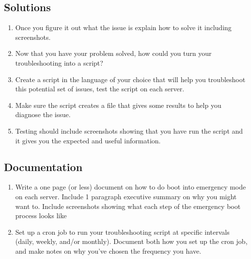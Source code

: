 \documentclass[12pt]{article}
\begin{document}
\subsection*{Solutions}
        \begin{enumerate}
            \item Once you figure it out what the issue is explain how to solve it including screenshots.
            \item Now that you have your problem solved, how could you turn your troubleshooting into a script?
            \item Create a script in the language of your choice that will help you troubleshoot this potential set of issues, test the script on each server.
            \item Make sure the script creates a file that gives some results to help you diagnose the issue. 
            \item Testing should include screenshots showing that you have run the script and it gives you the expected and useful information. 
    \end{enumerate}

    \subsection*{Documentation}
    \begin{enumerate}   
        \item Write a one page (or less) document on how to do boot into emergency mode on each server. Include 1 paragraph executive summary on why you might want to. Include screenshots showing what each step of the emergency boot process looks like
        \item Set up a cron job to run your troubleshooting script at specific intervals (daily, weekly, and/or monthly). Document both how you set up the cron job, and make notes on why you've chosen the frequency you have.  

    \end{enumerate}
\end{document}
